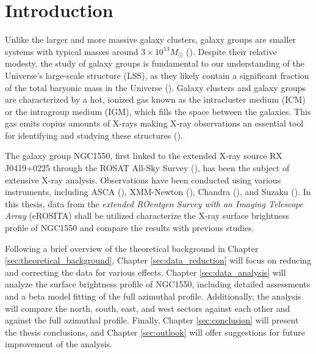 
\chapter{Introduction}
\label{sec:intro}
Unlike the larger and more massive galaxy clusters, galaxy groups are smaller systems with typical masses around \(3 \times 10^{13} M_{\odot}\) (\cite{Schneider_2006}). Despite their relative modesty, the study of galaxy groups is fundamental to our understanding of the Universe's large-scale structure (LSS), as they likely contain a significant fraction of the total baryonic mass in the Universe (\cite{Peebles1998}). Galaxy clusters and galaxy groups are characterized by a hot, ionized gas known as the intracluster medium (ICM) or the intragroup medium (IGM), which fills the space between the galaxies. This gas emits copius amounts of X-rays making X-ray observations an essential tool for identifying and studying these structures (\cite{KravtsovBorgani2012}).

The galaxy group NGC1550, first linked to the extended X-ray source RX J0419+0225 through the ROSAT All-Sky Survey (\cite{Bohringer_2000}), has been the subject of extensive X-ray analysis. Observations have been conducted using various instruments, including ASCA (\cite{Kawaharada_2003}), XMM-Newton (\cite{Kawaharada_2009}), Chandra (\cite{Sun_2003}), and Suzaku (\cite{Sato_2010}). In this thesis, data from the \textit{extended ROentgen Survey with an Imaging Telescope Array} (eROSITA) shall be utilized characterize the X-ray surface brightness profile of NGC1550 and compare the results with previous studies.

Following a brief overview of the theoretical background in Chapter \ref{sec:theoretical_background}, Chapter \ref{sec:data_reduction} will focus on reducing and correcting the data for various effects. Chapter \ref{sec:data_analysis} will analyze the surface brightness profile of NGC1550, including detailed assessments and a beta model fitting of the full azimuthal profile. Additionally, the analysis will compare the north, south, east, and west sectors against each other and against the full azimuthal profile. Finally, Chapter \ref{sec:conclusion} will present the thesis conclusions, and Chapter \ref{sec:outlook} will offer suggestions for future improvement of the analysis.